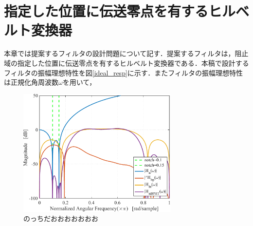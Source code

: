 \section{指定した位置に伝送零点を有するヒルベルト変換器}
本章では提案するフィルタの設計問題について記す．提案するフィルタは，阻止域の指定した位置に伝送零点を有するヒルベルト変換器である．本稿で設計するフィルタの振幅理想特性を図\ref{ideal_resp}に示す．またフィルタの振幅理想特性は正規化角周波数$\omega$を用いて，

\begin{figure}[tb]
    \centering
    \includegraphics[width=8cm]
    		{Figure/figure01.pdf}
    \caption{のっちだおおおおおおお}
    \label{fig:man}
\end{figure}